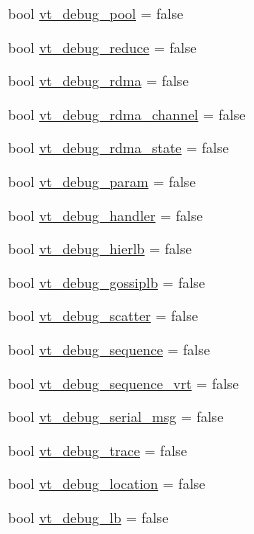 \begin{DoxyCompactItemize}
bool \hyperlink{structvt_1_1arguments_1_1_app_config_a750d786fe5cbd8997a125e15d22d5649}{vt\+\_\+debug\+\_\+pool} = false
\item 
bool \hyperlink{structvt_1_1arguments_1_1_app_config_afbd51efafa7ed24270a965af6e596232}{vt\+\_\+debug\+\_\+reduce} = false
\item 
bool \hyperlink{structvt_1_1arguments_1_1_app_config_ac744fcf1a3e63a83bc5a6c6f2c7f318c}{vt\+\_\+debug\+\_\+rdma} = false
\item 
bool \hyperlink{structvt_1_1arguments_1_1_app_config_a2220d56f6ae5d1ff6215e081d40cd002}{vt\+\_\+debug\+\_\+rdma\+\_\+channel} = false
\item 
bool \hyperlink{structvt_1_1arguments_1_1_app_config_a74e006fcccf1289d93626956ab641912}{vt\+\_\+debug\+\_\+rdma\+\_\+state} = false
\item 
bool \hyperlink{structvt_1_1arguments_1_1_app_config_ab731f1995a1c2c660f667f5d9ab933b4}{vt\+\_\+debug\+\_\+param} = false
\item 
bool \hyperlink{structvt_1_1arguments_1_1_app_config_a9331ea1d20bd6e8b4686205145a2ab80}{vt\+\_\+debug\+\_\+handler} = false
\item 
bool \hyperlink{structvt_1_1arguments_1_1_app_config_aac2532cc4e175f69cc1a7195f0de1f74}{vt\+\_\+debug\+\_\+hierlb} = false
\item 
bool \hyperlink{structvt_1_1arguments_1_1_app_config_a26b21a1b3be5dfbc2bd0d7972a586483}{vt\+\_\+debug\+\_\+gossiplb} = false
\item 
bool \hyperlink{structvt_1_1arguments_1_1_app_config_a986874798c711a33adf02e9c14b6488b}{vt\+\_\+debug\+\_\+scatter} = false
\item 
bool \hyperlink{structvt_1_1arguments_1_1_app_config_ab0ac2b709e0424c78d38b5f7e6570ffc}{vt\+\_\+debug\+\_\+sequence} = false
\item 
bool \hyperlink{structvt_1_1arguments_1_1_app_config_adc64abd1a30dad4e238b14c254e41cd0}{vt\+\_\+debug\+\_\+sequence\+\_\+vrt} = false
\item 
bool \hyperlink{structvt_1_1arguments_1_1_app_config_acdbaa0fe035d7968ffd04cf0670aa3eb}{vt\+\_\+debug\+\_\+serial\+\_\+msg} = false
\item 
bool \hyperlink{structvt_1_1arguments_1_1_app_config_a7c73a592756e2372cd93a25f00aea5ef}{vt\+\_\+debug\+\_\+trace} = false
\item 
bool \hyperlink{structvt_1_1arguments_1_1_app_config_ac57469f6cd2d0cb219cfaca523c29509}{vt\+\_\+debug\+\_\+location} = false
\item 
bool \hyperlink{structvt_1_1arguments_1_1_app_config_a94b2ed828b4f2a6e30162358a500e304}{vt\+\_\+debug\+\_\+lb} = false

\end{DoxyCompactItemize}
